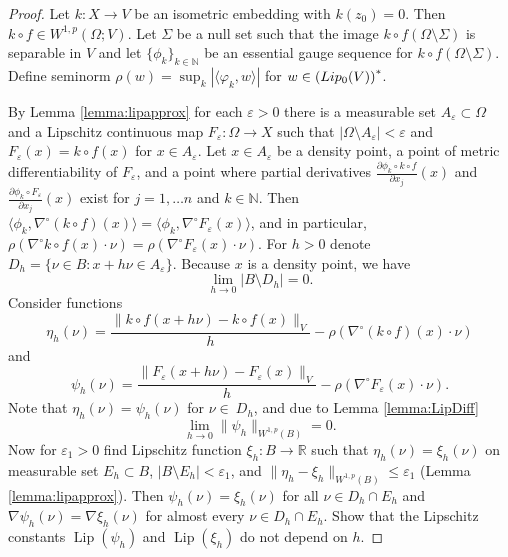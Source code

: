 \documentclass[10pt,a4paper]{amsart}
\begin{document}
\begin{proof}
Let $k:X\to V$ be an isometric embedding with $k(z_0)=0$. Then $k\circ f \in W^{1,p}(\Omega; V)$.
Let $\Sigma$ be a null set such that the image $k\circ f(\Omega\setminus\Sigma)$ is separable in $V$ and let $\{\phi_k\}_{k\in\mathbb N}$ be an essential gauge sequence for 
$k\circ f(\Omega\setminus\Sigma)$.
Define seminorm
$
\rho(w) = \sup_k|  \langle \varphi_k, w \rangle|
$
for $w\in \left(\textnormal{Lip}_{0}(V)\right)^*$.

By Lemma \ref{lemma:lipapprox} for each $\varepsilon>0$ there is a measurable set $A_\varepsilon\subset\Omega$
and a Lipschitz continuous map $F_\varepsilon:\Omega\to X$ such that $|\Omega\setminus A_\varepsilon|<\varepsilon$
and $F_\varepsilon(x) = k\circ f(x)$ for $x\in A_\varepsilon$. 
Let $x\in A_\varepsilon$ be a density point, a point of metric differentiability of $F_\varepsilon$,
and a point where partial derivatives $\frac{\partial \phi_k\circ k\circ  f}{\partial x_j}(x)$ and $\frac{\partial \phi_k\circ F_\varepsilon}{\partial x_j}(x)$
exist for $j=1,\dots n$ and $k\in \mathbb N$.
Then $\langle \phi_k, \nabla^{\circ} (k\circ f)(x) \rangle = \langle \phi_k, \nabla^{\circ}F_\varepsilon(x) \rangle $,
and in particular, $\rho(\nabla^{\circ}k\circ f(x)\cdot\nu ) = \rho(\nabla^{\circ}F_\varepsilon (x)\cdot\nu )$.
For $h>0$ denote $D_h = \{\nu\in B \colon x + h\nu \in A_\varepsilon\}$.
Because $x$ is a density point, we have 
\begin{equation}\label{eq:BD-0}
\lim_{h\to 0} |B\setminus D_h| = 0.
\end{equation}
Consider functions
\[
\eta_h(\nu) = \frac{\|k\circ f(x+h\nu) - k\circ f(x)\|_V}{h} - \rho(\nabla^{\circ}(k\circ f)(x)\cdot\nu )
\]
and
\[
\psi_h(\nu) = \frac{\| F_\varepsilon(x+h\nu) -  F_\varepsilon(x)\|_V}{h} - \rho(\nabla^{\circ}F_\varepsilon (x)\cdot\nu ).
\]
Note that $\eta_h(\nu) = \psi_h(\nu)$ for $\nu\in\ D_h$, and
due to Lemma \ref{lemma:LipDiff} 
\begin{equation}\label{eq:psi-0}
\lim_{h\to 0} \| \psi_h\|_{W^{1,p}(B)} = 0.
\end{equation} 
Now for $\varepsilon_1>0$ find Lipschitz function $\xi_h:B\to \mathbb R$ such that 
$\eta_h(\nu) = \xi_h(\nu)$ on measurable set $E_h\subset B$, $|B\setminus E_h| < \varepsilon_1$, and
$\|\eta_h - \xi_h \|_{W^{1,p}(B)}\leq\varepsilon_1$ (Lemma \ref{lemma:lipapprox}).
Then $\psi_h(\nu) = \xi_h(\nu)$ for all $\nu\in D_h\cap E_h$ and $\nabla\psi_h(\nu) = \nabla\xi_h(\nu)$ for almost every $\nu\in D_h\cap E_h$.
Show that the Lipschitz constants $\operatorname{Lip}(\psi_h)$ and $\operatorname{Lip}(\xi_h)$ do not depend on $h$.

\end{proof}
\end{document}
